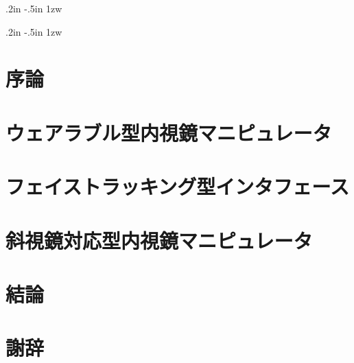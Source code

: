 
	\usepackage{makeidx}
	\newcommand{\bm}[1]{\mbox{\boldmath{$#1$}}}
	\def\rubyfont{\tiny}
	\makeatletter
	\def\ruby#1#2{\leavevmode\vbox{%
	\baselineskip\z@skip\lineskip.25ex
	\ialign{##\crcr\rubyfont\hfill#2\hfill\crcr
	\hfill#1\hfill\crcr}}}
	\textwidth 6.5in
	\textheight 9.5in
	\oddsidemargin .2in
	\topmargin -.5in
	\parindent 1zw
	\makeindex
	


\usepackage{makeidx}
	\newcommand{\bm}[1]{\mbox{\boldmath{$#1$}}}
	\def\rubyfont{\tiny}
	\makeatletter
	\def\ruby#1#2{\leavevmode\vbox{%
	\baselineskip\z@skip\lineskip.25ex
	\ialign{##\crcr\rubyfont\hfill#2\hfill\crcr
	\hfill#1\hfill\crcr}}}
	\textwidth 6.5in
	\textheight 9.5in
	\oddsidemargin .2in
	\topmargin -.5in
	\parindent 1zw
	\makeindex
	

	
	\tableofcontents\newpage
	\listoffigures\newpage
	\listoftables\newpage
	\pagebreak
\chapter{序論}

\chapter{ウェアラブル型内視鏡マニピュレータ}

\chapter{フェイストラッキング型インタフェース}\label{famous}

\chapter{斜視鏡対応型内視鏡マニピュレータ}

\chapter{結論}

\chapter{謝辞}




\printindex{}


